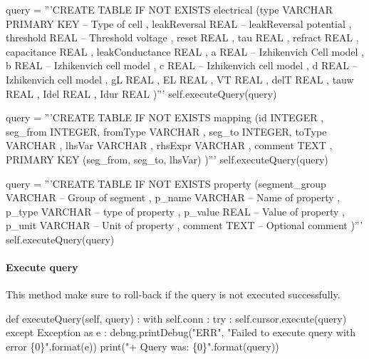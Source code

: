 \documentclass[]{article}%
\begin{document}
  query = '''CREATE TABLE IF NOT EXISTS electrical
    (type VARCHAR PRIMARY KEY -- Type of cell
    , leakReversal REAL       -- leakReversal potential
    , threshold REAL          -- Threshold voltage
    , reset REAL
    , tau REAL
    , refract REAL
    , capacitance REAL
    , leakConductance REAL
    , a REAL                  -- Izhikenvich Cell model
    , b REAL                  -- Izhikenvich cell model
    , c REAL                  -- Izhikenvich cell model 
    , d REAL                  -- Izhikenvich cell model
    , gL REAL
    , EL REAL
    , VT REAL
    , delT REAL
    , tauw REAL
    , Idel REAL
    , Idur REAL
    )'''
  self.executeQuery(query)

  query = '''CREATE TABLE IF NOT EXISTS mapping
    (id INTEGER
    , seg_from INTEGER, fromType VARCHAR
    , seg_to INTEGER,  toType VARCHAR
    , lhsVar VARCHAR
    , rhsExpr VARCHAR 
    , comment TEXT
    , PRIMARY KEY (seg_from, seg_to, lhsVar)
    )'''
  self.executeQuery(query)

  query = '''CREATE TABLE IF NOT EXISTS property
    (segment_group VARCHAR    -- Group of segment
    , p_name VARCHAR            -- Name of property 
    , p_type VARCHAR            -- type of property 
    , p_value REAL              -- Value of property 
    , p_unit  VARCHAR           -- Unit of property
    , comment TEXT              -- Optional comment 
    )'''
  self.executeQuery(query)


\eatline
{}\nwendcode{}\nwdocspar
\paragraph{Execute query}

  This method make sure to roll-back if the query is not executed successfully.

\nwenddocs{}\plusendmoddef\nwstartdeflinemarkup{}\nwenddeflinemarkup
def executeQuery(self, query) :
  with self.conn :
    try :
      self.cursor.execute(query)
    except Exception as e :
      debug.printDebug("ERR", "Failed to execute query with error \{0\}".format(e))
      print("+ Query was: \{0\}".format(query))
\end{document}
